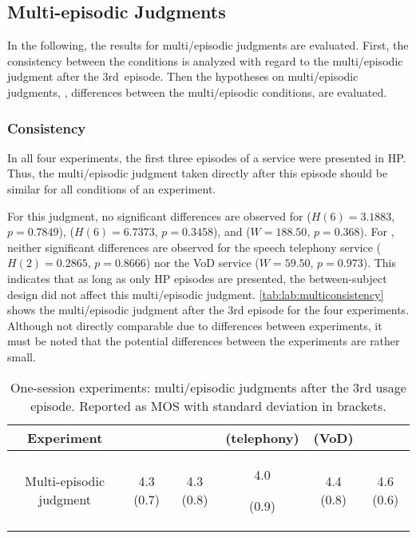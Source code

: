 \subsection{Multi-episodic Judgments}
In the following, the results for multi\-/episodic judgments are evaluated.
First, the consistency between the conditions is analyzed with regard to the multi\-/episodic judgment after the 3rd~episode.
Then the hypotheses on multi\-/episodic judgments, \ie, differences between the multi\-/episodic conditions, are evaluated.

\subsubsection{Consistency}
In all four experiments, the first three episodes of a service were presented in \ac{HP}.
Thus, the multi\-/episodic judgment taken directly after this episode should be similar for all conditions of an experiment.

For this judgment, no significant differences are observed for  ($H(6)=3.1883$, $p=0.7849$), \EIIa{} ($H(6)=6.7373$, $p=0.3458$), and  ($W=188.50$, $p=0.368$).
For \EIIb{}, neither significant differences are observed for the speech telephony service ($H(2)=0.2865$, $p=0.8666$) nor the \ac{VoD} service ($W=59.50$, $p=0.973$).
This indicates that as long as only \ac{HP} episodes are presented, the between-subject design did not affect this multi\-/episodic judgment.
\autoref{tab:lab:multiconsistency} shows the multi\-/episodic judgment after the 3rd episode for the four experiments.
Although not directly comparable due to differences between experiments, it must be noted that the potential differences between the experiments are rather small.

\begin{table}[t]
	\centering
	\caption[One-session experiments: multi\-/episodic judgments after the 3rd usage episode]{One-session experiments: multi\-/episodic judgments after the 3rd usage episode. Reported as \ac{MOS} with standard deviation in brackets.} %
	\label{tab:lab:multiconsistency}
	\begin{tabulary}{\textwidth}{C|C|C|C|C|C}
	Experiment &  & \EIIa{} &\EIIb{} (telephony) & \EIIb{}	(\ac{VoD})	&  \\
	\midrule
	Multi-episodic judgment & 4.3 (0.7) & 4.3 (0.8) & 4.0 \par (0.9)& 4.4 (0.8) & 4.6 (0.6) \\
	\end{tabulary}
\end{table}

